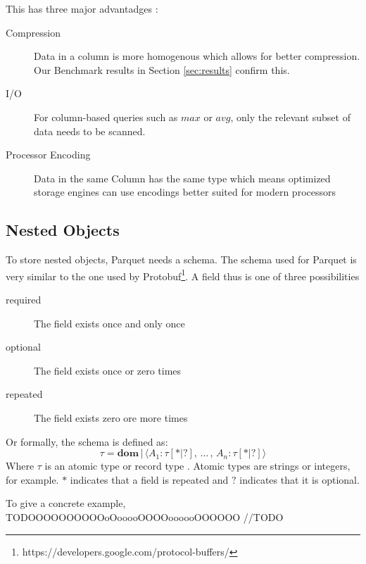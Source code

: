 This has three major advantadges \cite{dremel-parquet:Twitter}:
\begin{description}
\item[Compression] Data in a column is more homogenous which allows for better compression. Our Benchmark results in Section \ref{sec:results} confirm this.
\item[I/O] For column-based queries such as $max$ or $avg$, only the relevant subset of data needs to be scanned.
\item[Processor Encoding] Data in the same Column has the same type which means optimized storage engines can use encodings better suited for modern processors
\end{description}

\subsection{Nested Objects}
\label{section:parquet-nested}
To store nested objects, Parquet needs a schema.
The schema used for Parquet is very similar to the one used by Protobuf\footnote{https://developers.google.com/protocol-buffers/}.
A field thus is one of three possibilities

\begin{description}
\item[required] The field exists once and only once
\item[optional] The field exists once or zero times
\item[repeated] The field exists zero ore more times
\end{description}

Or formally, the schema is defined as:
\begin{equation}
\tau = \mathbf{dom} \,|\, \langle A_{1} : \tau [*|?], \, \dots \,, \,  A_{n} : \tau [*|?]\rangle
\end{equation}
Where $\tau$ is an atomic type or record type \cite{dremel:melnik}. Atomic types are strings or integers, for example.
$*$ indicates that a field is repeated and $?$ indicates that it is optional.

To give a concrete example, TODOOOOOOOOOOoOooooOOOOoooooOOOOOO  //TODO
